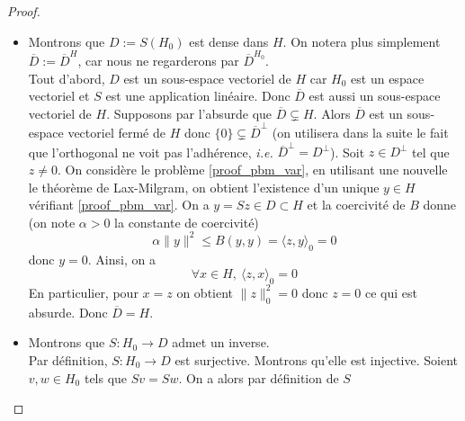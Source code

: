 \begin{appendices}
\begin{proof}
\begin{itemize}
        \begin{equation}\label{proof_eg2}
            \forall x \in H, \ B(\lambda y, x) = \langle \lambda z, x\rangle_0
        \end{equation}
        On somme \eqref{proof_eg1} et \eqref{proof_eg2}, ce qui donne en utilisant à nouveau la linéarité
        \begin{eqnarray*}
            \forall x \in H, \ B(\lambda y + y',x) = \langle \lambda z+z', x \rangle_0
        \end{eqnarray*}
        Ainsi,
        \begin{eqnarray*}
            S(\lambda z+z') = \lambda y+y' = \lambda S(z) + S(z')
        \end{eqnarray*}
        d'où la linéarité de $S$.
        \item Montrons que $D:=S(H_0)$ est dense dans $H$. On notera plus simplement $\overline{D}:=\overline{D}^H$, car nous ne regarderons par $\overline{D}^{H_0}$.
        \\
        Tout d'abord, $D$ est un sous-espace vectoriel de $H$ car $H_0$ est un espace vectoriel et $S$ est une application linéaire. Donc $\overline{D}$ est aussi un sous-espace vectoriel de $H$. Supposons par l'absurde que $\overline{D} \subsetneq H$. Alors $\overline{D}$ est un sous-espace vectoriel fermé de $H$ donc $\{0\} \subsetneq \overline{D}^{\perp}$ (on utilisera dans la suite le fait que l'orthogonal \og ne voit pas \fg{} l'adhérence, \textit{i.e.} $\overline{D}^{\perp} = D^{\perp}$). Soit $z \in D^{\perp}$ tel que $z\neq 0$. On considère le problème \eqref{proof_pbm_var}, en utilisant une nouvelle le théorème de Lax-Milgram, on obtient l'existence d'un unique $y \in H$ vérifiant \eqref{proof_pbm_var}. On a $y=Sz \in D \subset H$ et la coercivité de $B$ donne (on note $\alpha >0$ la constante de coercivité)
        \begin{equation*}
            \alpha \|y\|^2 \leq B(y,y) = \langle z,y \rangle_0 = 0
        \end{equation*}
        donc $y=0$. Ainsi, on a
        \begin{equation*}
            \forall x \in H, \ \langle z, x \rangle_0 = 0
        \end{equation*}
        En particulier, pour $x=z$ on obtient $\|z\|_0^2=0$ donc $z=0$ ce qui est absurde. Donc $\overline{D} = H$.
        \item Montrons que $S : H_0 \rightarrow D$ admet un inverse.
        \\
        Par définition, $S : H_0 \rightarrow D$ est surjective. Montrons qu'elle est injective. Soient $v,w \in H_0$ tels que $Sv = Sw$. On a alors par définition de $S$

\end{itemize}
\end{proof}
\end{appendices}
